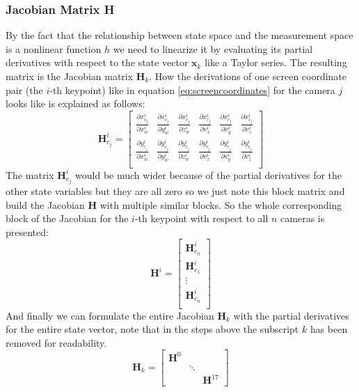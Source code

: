 \subsubsection{Jacobian Matrix H} \label{sec:jacobian}
By the fact that the relationship between state space and the measurement space is a nonlinear function $h$ we need to linearize it by evaluating its partial derivatives with respect to the state vector $\mathbf{x}_k$ like a Taylor series. The resulting matrix is the Jacobian matrix $\mathbf{H}_k$. How the derivations of one screen coordinate pair (the $i$-th keypoint) like in equation \ref{eq:screencoordinates} for the camera $j$ looks like is explained as follows:
\begin{equation}\label{eq:partial}
\mathbf{H}_{c_j}^i = 
\begin{bmatrix}
\frac{\partial x^i_{c_j}}{\partial x^i_w} & \frac{\partial x^i_{c_j}}{\partial y^i_w} & \frac{\partial x^i_{c_j}}{\partial z^i_w} & \frac{\partial x^i_{c_j}}{\partial v^i_x} & \frac{\partial x^i_{c_j}}{\partial v^i_y} & \frac{\partial x^i_{c_j}}{\partial v^i_z} \\
\frac{\partial y^i_{c_j}}{\partial x^i_w} & \frac{\partial y^i_{c_j}}{\partial y^i_w} & \frac{\partial y^i_{c_j}}{\partial z^i_w} & \frac{\partial y^i_{c_j}}{\partial v^i_x} & \frac{\partial y^i_{c_j}}{\partial v^i_y} & \frac{\partial y^i_{c_j}}{\partial v^i_z} \\
\end{bmatrix}
\end{equation}
The matrix $\mathbf{H}_{c_j}^i$ would be much wider because of the partial derivatives for the other state variables but they are all zero so we just note this block matrix and build the Jacobian $\mathbf{H}$ with multiple similar blocks. So the whole corresponding block of the Jacobian for the $i$-th keypoint with respect to all $n$ cameras is presented:
\begin{equation}
\mathbf{H}^i =
\begin{bmatrix}
\mathbf{H}_{c_0}^i \\
\mathbf{H}_{c_1}^i \\
\vdots \\
\mathbf{H}_{c_n}^i \\
\end{bmatrix}
\end{equation}
And finally we can formulate the entire Jacobian $\mathbf{H}_k$ with the partial derivatives for the entire state vector, note that in the steps above the subscript $k$ has been removed for readability.
\begin{equation}
\mathbf{H}_k =
\begin{bmatrix}
\mathbf{H}^0 &  & \\
& \ddots & \\
& & \mathbf{H}^{17}
\end{bmatrix}
\end{equation}
